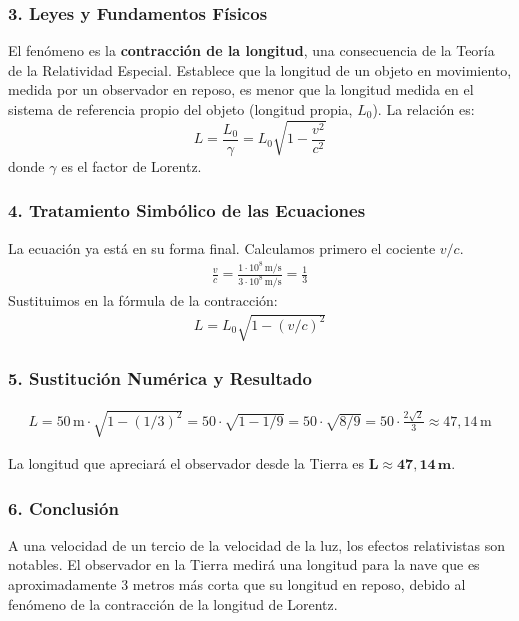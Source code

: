 \subsubsection*{3. Leyes y Fundamentos Físicos}
El fenómeno es la \textbf{contracción de la longitud}, una consecuencia de la Teoría de la Relatividad Especial. Establece que la longitud de un objeto en movimiento, medida por un observador en reposo, es menor que la longitud medida en el sistema de referencia propio del objeto (longitud propia, $L_0$). La relación es:
$$ L = \frac{L_0}{\gamma} = L_0 \sqrt{1 - \frac{v^2}{c^2}} $$
donde $\gamma$ es el factor de Lorentz.

\subsubsection*{4. Tratamiento Simbólico de las Ecuaciones}
La ecuación ya está en su forma final. Calculamos primero el cociente $v/c$.
\begin{gather}
    \frac{v}{c} = \frac{1\cdot10^8\,\text{m/s}}{3\cdot10^8\,\text{m/s}} = \frac{1}{3}
\end{gather}
Sustituimos en la fórmula de la contracción:
\begin{gather}
    L = L_0 \sqrt{1 - (v/c)^2}
\end{gather}

\subsubsection*{5. Sustitución Numérica y Resultado}
\begin{gather}
    L = 50\,\text{m} \cdot \sqrt{1 - (1/3)^2} = 50 \cdot \sqrt{1 - 1/9} = 50 \cdot \sqrt{8/9} = 50 \cdot \frac{2\sqrt{2}}{3} \approx 47,14\,\text{m}
\end{gather}
\begin{cajaresultado}
La longitud que apreciará el observador desde la Tierra es $\boldsymbol{L \approx 47,14 \, \textbf{m}}$.
\end{cajaresultado}

\subsubsection*{6. Conclusión}
\begin{cajaconclusion}
A una velocidad de un tercio de la velocidad de la luz, los efectos relativistas son notables. El observador en la Tierra medirá una longitud para la nave que es aproximadamente 3 metros más corta que su longitud en reposo, debido al fenómeno de la contracción de la longitud de Lorentz.
\end{cajaconclusion}

